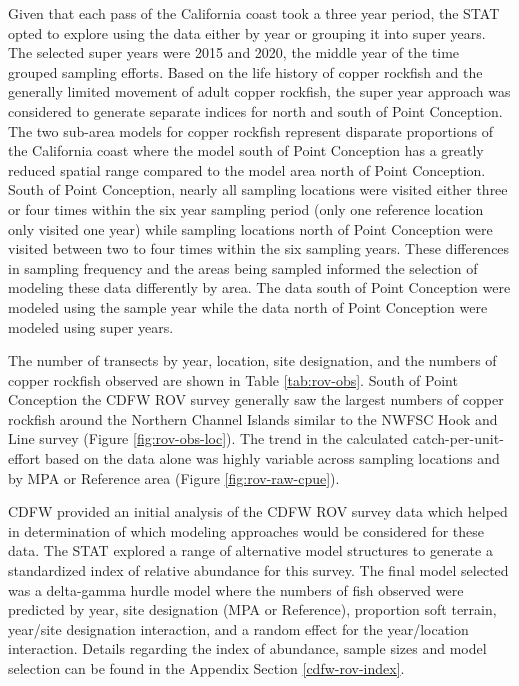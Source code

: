 \documentclass[11pt,
  english,
  letterpaper,
]{article}
\begin{document}
Given that each pass of the California coast took a three year period, the STAT opted to explore using the data either by year or grouping it into super years. The selected super years were 2015 and 2020, the middle year of the time grouped sampling efforts. Based on the life history of copper rockfish and the generally limited movement of adult copper rockfish, the super year approach was considered to generate separate indices for north and south of Point Conception. The two sub-area models for copper rockfish represent disparate proportions of the California coast where the model south of Point Conception has a greatly reduced spatial range compared to the model area north of Point Conception. South of Point Conception, nearly all sampling locations were visited either three or four times within the six year sampling period (only one reference location only visited one year) while sampling locations north of Point Conception were visited between two to four times within the six sampling years. These differences in sampling frequency and the areas being sampled informed the selection of modeling these data differently by area. The data south of Point Conception were modeled using the sample year while the data north of Point Conception were modeled using super years.

The number of transects by year, location, site designation, and the numbers of copper rockfish observed are shown in Table \ref{tab:rov-obs}. South of Point Conception the CDFW ROV survey generally saw the largest numbers of copper rockfish around the Northern Channel Islands similar to the NWFSC Hook and Line survey (Figure \ref{fig:rov-obs-loc}). The trend in the calculated catch-per-unit-effort based on the data alone was highly variable across sampling locations and by MPA or Reference area (Figure \ref{fig:rov-raw-cpue}).

CDFW provided an initial analysis of the CDFW ROV survey data which helped in determination of which modeling approaches would be considered for these data. The STAT explored a range of alternative model structures to generate a standardized index of relative abundance for this survey. The final model selected was a delta-gamma hurdle model where the numbers of fish observed were predicted by year, site designation (MPA or Reference), proportion soft terrain, year/site designation interaction, and a random effect for the year/location interaction. Details regarding the index of abundance, sample sizes and model selection can be found in the Appendix Section \ref{cdfw-rov-index}.
\end{document}
